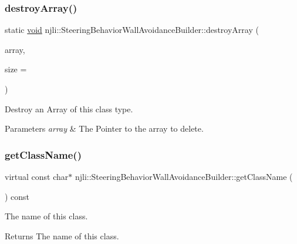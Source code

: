 \subsubsection{\texorpdfstring{destroy\+Array()}{destroyArray()}}
{\footnotesize\ttfamily static \mbox{\hyperlink{_thread_8h_af1e856da2e658414cb2456cb6f7ebc66}{void}} njli\+::\+Steering\+Behavior\+Wall\+Avoidance\+Builder\+::destroy\+Array (\begin{DoxyParamCaption}\item[{\mbox{\hyperlink{classnjli_1_1_steering_behavior_wall_avoidance_builder}{Steering\+Behavior\+Wall\+Avoidance\+Builder}} $\ast$$\ast$}]{array,  }\item[{const \mbox{\hyperlink{_util_8h_a10e94b422ef0c20dcdec20d31a1f5049}{u32}}}]{size = {} }\end{DoxyParamCaption})\hspace{0.3cm}{\ttfamily [static]}}

Destroy an Array of this class type.


\begin{DoxyParams}{Parameters}
{\em array} & The Pointer to the array to delete. \\
\hline
\end{DoxyParams}
\mbox{\label{classnjli_1_1_steering_behavior_wall_avoidance_builder_a949132ba8e4c910935763c0d14ad5656}} 
\subsubsection{\texorpdfstring{get\+Class\+Name()}{getClassName()}}
{\footnotesize\ttfamily virtual const char$\ast$ njli\+::\+Steering\+Behavior\+Wall\+Avoidance\+Builder\+::get\+Class\+Name (\begin{DoxyParamCaption}{ }\end{DoxyParamCaption}) const\hspace{0.3cm}{\ttfamily [virtual]}}

The name of this class.

\begin{DoxyReturn}{Returns}
The name of this class. 
\end{DoxyReturn}


